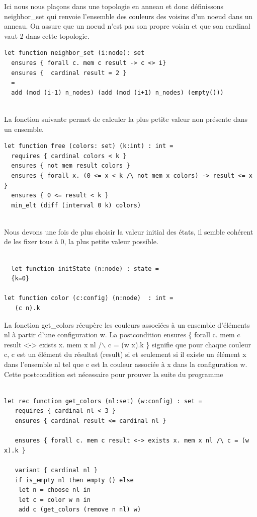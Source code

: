 \documentclass[11pt]{article}
\begin{document}
Ici nous nous plaçons dans une topologie en anneau et donc définissons neighbor\_set qui renvoie l'ensemble des couleurs des voisins d'un 
noeud dans un anneau. 
On assure que un noeud n'est pas son propre voisin et que son cardinal vaut 2 dans cette topologie.

\lstset{language=why3,label= ,caption= ,captionpos=b,numbers=none}
\begin{lstlisting}
let function neighbor_set (i:node): set
  ensures { forall c. mem c result -> c <> i}
  ensures {  cardinal result = 2 } 
  =
  add (mod (i-1) n_nodes) (add (mod (i+1) n_nodes) (empty()))


\end{lstlisting}


La fonction suivante permet de calculer la plus petite valeur non présente dans un ensemble. 

\lstset{language=why3,label= ,caption= ,captionpos=b,numbers=none}
\begin{lstlisting}
let function free (colors: set) (k:int) : int =
  requires { cardinal colors < k }
  ensures { not mem result colors }
  ensures { forall x. (0 <= x < k /\ not mem x colors) -> result <= x }
  ensures { 0 <= result < k }
  min_elt (diff (interval 0 k) colors)


\end{lstlisting}

Nous devons une fois de plus choisir la valeur initial des états, il semble cohérent de les fixer tous à 0, la plus petite valeur possible.

\lstset{language=why3,label= ,caption= ,captionpos=b,numbers=none}
\begin{lstlisting}

  let function initState (n:node) : state =
  {k=0}

let function color (c:config) (n:node)  : int =
   (c n).k

\end{lstlisting}

La fonction get\_colors récupère les couleurs associées à un ensemble d'éléments nl à partir d'une configuration w. 
La postcondition ensures \{ forall c. mem c result <-> exists x. mem x nl /$\backslash$ c = (w x).k \} signifie
que pour chaque couleur c, c est un élément du résultat (result) si et seulement si 
il existe un élément x dans l'ensemble nl tel que c est la couleur associée à x dans la configuration w.
Cette postcondition est nécessaire pour prouver la suite du programme

\lstset{language=why3,label= ,caption= ,captionpos=b,numbers=none}
\begin{lstlisting}

let rec function get_colors (nl:set) (w:config) : set =
   requires { cardinal nl < 3 }
   ensures { cardinal result <= cardinal nl }

   ensures { forall c. mem c result <-> exists x. mem x nl /\ c = (w x).k }

   variant { cardinal nl }
   if is_empty nl then empty () else
    let n = choose nl in
    let c = color w n in
    add c (get_colors (remove n nl) w)

\end{lstlisting}
\end{document}
